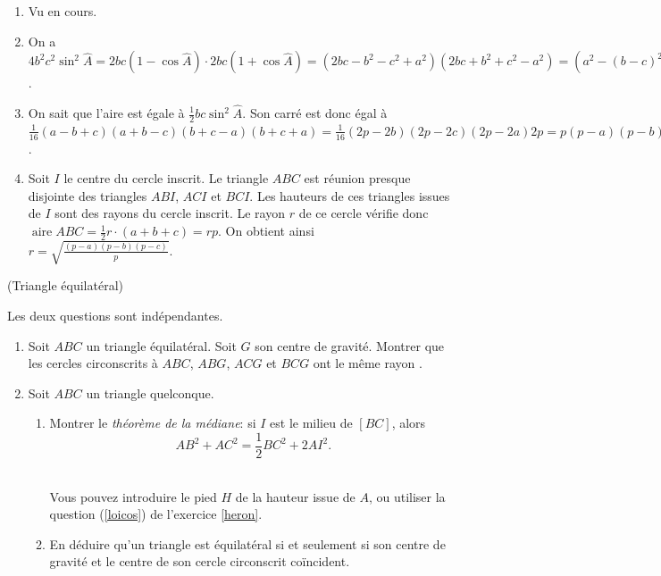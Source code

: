 \documentclass[a4paper,12pt,reqno]{amsart}
\DeclareMathOperator{\aire}{aire}
\begin{document}
\begin{solution}

  \begin{enumerate}
    \item Vu en cours.
    \item On a $4b^2c^2\sin^2\widehat A=2bc(1-\cos\widehat{A})\cdot 2bc(1+\cos\widehat{A})=(2bc-b^2-c^2+a^2)(2bc+b^2+c^2-a^2)=(a^2-(b-c)^2)((b+c)^2-a^2)$.
    \item On sait que l'aire est égale à $\frac{1}{2} bc\sin^2\widehat{A}$. Son carré est donc égal à $\frac{1}{16}(a-b+c)(a+b-c)(b+c-a)(b+c+a)=\frac{1}{16}(2p-2b)(2p-2c)(2p-2a)2p=p(p-a)(p-b)(p-c)$.
    \item Soit $I$ le centre du cercle inscrit. Le triangle $ABC$ est réunion presque disjointe des triangles $ABI$, $ACI$ et $BCI$. Les hauteurs de ces triangles issues de $I$ sont des rayons du cercle inscrit. Le rayon $r$ de ce cercle vérifie donc $\aire{ABC}=\frac{1}{2} r\cdot (a+b+c)=rp$. On obtient ainsi $r=\sqrt{\frac{(p-a)(p-b)(p-c)}{p}}$.
  \end{enumerate}
\end{solution}


\begin{exo} (Triangle équilatéral)

  Les deux questions sont indépendantes.
  \begin{enumerate}
    \item Soit $ABC$  un triangle équilatéral. Soit $G$ son centre de gravité. Montrer que les cercles circonscrits à $ABC$, $ABG$, $ACG$ et $BCG$ ont le même rayon%
    .
    \item Soit $ABC$ un triangle quelconque.
    \begin{enumerate}
    \item Montrer le \emph{théorème de la médiane}: si $I$ est le milieu de $[BC]$, alors $${AB^2+AC^2=\frac{1}{2}BC^2+2AI^2}.$$ \\
    \begin{indication}
      Vous pouvez introduire le pied $H$ de la hauteur issue de $A$, ou utiliser la question (\ref{loicos}) de l'exercice \ref{heron}.
    \end{indication}
    \item En déduire qu'un triangle est équilatéral si et seulement si son centre de gravité et le centre de son cercle circonscrit coïncident.
  \end{enumerate}
\end{enumerate}
\end{exo}
\end{document}
